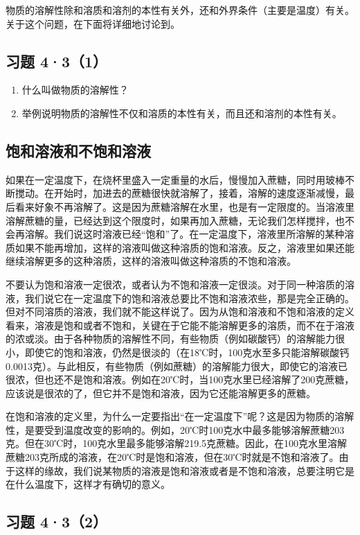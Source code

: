 物质的溶解性除和溶质和溶剂的本性有关外，还和外界条件（主要是温度）有关。关于这个问题，在下面将详细地讨论到。

\subsection{习题 4·3（1）}

\begin{enumerate}
\item
  什么叫做物质的溶解性？
\item
  举例说明物质的溶解性不仅和溶质的本性有关，而且还和溶剂的本性有关。
\end{enumerate}

\subsection{饱和溶液和不饱和溶液}

如果在一定温度下，在烧杯里盛入一定重量的水后，慢慢加入蔗糖，同时用玻棒不断搅动。在开始时，加进去的蔗糖很快就溶解了，接着，溶解的速度逐渐减慢，最后看来好象不再溶解了。这是因为蔗糖溶解在水里，也是有一定限度的。当溶液里溶解蔗糖的量，已经达到这个限度时，如果再加入蔗糖，无论我们怎样搅拌，也不会再溶解。我们说这时溶液已经``饱和''了。在一定温度下，溶液里所溶解的某种溶质如果不能再增加，这样的溶液叫做这种溶质的饱和溶液。反之，溶液里如果还能继续溶解更多的这种溶质，这样的溶液叫做这种溶质的不饱和溶液。

不要认为饱和溶液一定很浓，或者认为不饱和溶液一定很淡。对于同一种溶质的溶液，我们说它在一定温度下的饱和溶液总要比不饱和溶液浓些，那是完全正确的。但对不同溶质的溶液，我们就不能这样说了。因为从饱和溶液和不饱和溶液的定义看来，溶液是饱和或者不饱和，关键在于它能不能溶解更多的溶质，而不在于溶液的浓或淡。由于各种物质的溶解性不同，有些物质（例如碳酸钙）的溶解能力很小，即使它的饱和溶液，仍然是很淡的（在18℃时，100克水至多只能溶解碳酸钙0.0013克）。与此相反，有些物质（例如蔗糖）的溶解能力很大，即使它的溶液已很浓，但也还不是饱和溶液。例如在20℃时，当100克水里已经溶解了200克蔗糖，应该说是很浓的了，但它并不是饱和溶液，因为它还能溶解更多的蔗糖。

在饱和溶液的定义里，为什么一定要指出``在一定温度下''呢？这是因为物质的溶解性，是要受到温度改变的影响的。例如，20℃时100克水中最多能够溶解蔗糖203克。但在30℃时，100克水里最多能够溶解219.5克蔗糖。因此，在100克水里溶解蔗糖203克所成的溶液，在20℃时是饱和溶液，但在30℃时就是不饱和溶液了。由于这样的缘故，我们说某物质的溶液是饱和溶液或者是不饱和溶液，总要注明它是在什么温度下，这样才有确切的意义。

\subsection{习题 4·3（2）}

